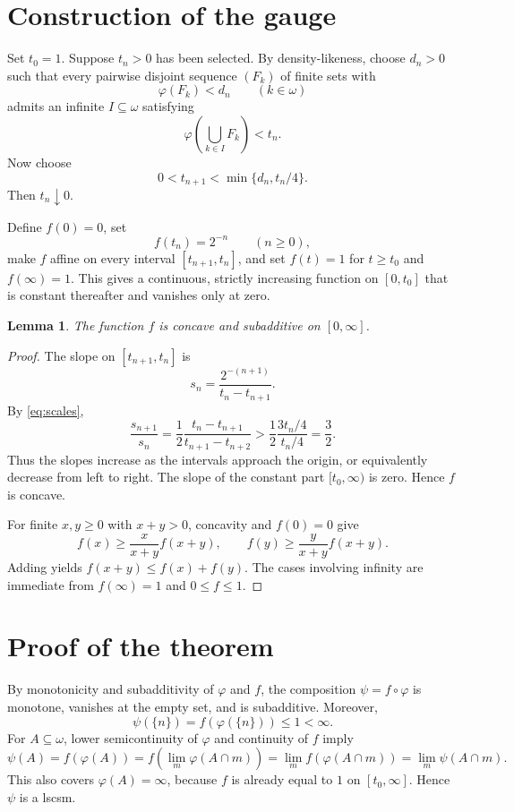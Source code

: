 \documentclass[11pt]{article}
\newtheorem{lemma}[theorem]{Lemma}
\begin{document}
\section{Construction of the gauge}

Set $t_0=1$. Suppose $t_n>0$ has been selected. By density-likeness, choose $d_n>0$ such that every pairwise disjoint sequence $(F_k)$ of finite sets with
\[
 \varphi(F_k)<d_n\qquad(k\in\omega)
\]
admits an infinite $I\subseteq\omega$ satisfying
\[
 \varphi\left(\bigcup_{k\in I}F_k\right)<t_n.
\]
Now choose
\begin{equation}\label{eq:scales}
 0<t_{n+1}<\min\{d_n,t_n/4\}.
\end{equation}
Then $t_n\downarrow0$.

Define $f(0)=0$, set
\[
 f(t_n)=2^{-n}\qquad(n\ge0),
\]
make $f$ affine on every interval $[t_{n+1},t_n]$, and set $f(t)=1$ for $t\ge t_0$ and $f(\infty)=1$. This gives a continuous, strictly increasing function on $[0,t_0]$ that is constant thereafter and vanishes only at zero.

\begin{lemma}\label{lem:concave}
The function $f$ is concave and subadditive on $[0,\infty]$.
\end{lemma}

\begin{proof}
The slope on $[t_{n+1},t_n]$ is
\[
 s_n=\frac{2^{-(n+1)}}{t_n-t_{n+1}}.
\]
By \eqref{eq:scales},
\[
 \frac{s_{n+1}}{s_n}
 =\frac12\frac{t_n-t_{n+1}}{t_{n+1}-t_{n+2}}
 >\frac12\frac{3t_n/4}{t_n/4}
 =\frac32.
\]
Thus the slopes increase as the intervals approach the origin, or equivalently decrease from left to right. The slope of the constant part $[t_0,\infty)$ is zero. Hence $f$ is concave.

For finite $x,y\ge0$ with $x+y>0$, concavity and $f(0)=0$ give
\[
 f(x)\ge\frac{x}{x+y}f(x+y),
 \qquad
 f(y)\ge\frac{y}{x+y}f(x+y).
\]
Adding yields $f(x+y)\le f(x)+f(y)$. The cases involving infinity are immediate from $f(\infty)=1$ and $0\le f\le1$.
\end{proof}

\section{Proof of the theorem}

By monotonicity and subadditivity of $\varphi$ and $f$, the composition $\psi=f\circ\varphi$ is monotone, vanishes at the empty set, and is subadditive. Moreover,
\[
 \psi(\{n\})=f(\varphi(\{n\}))\le1<\infty.
\]
For $A\subseteq\omega$, lower semicontinuity of $\varphi$ and continuity of $f$ imply
\[
 \psi(A)=f(\varphi(A))
 =f\left(\lim_m\varphi(A\cap m)\right)
 =\lim_m f(\varphi(A\cap m))
 =\lim_m\psi(A\cap m).
\]
This also covers $\varphi(A)=\infty$, because $f$ is already equal to $1$ on $[t_0,\infty]$. Hence $\psi$ is a lscsm.
\end{document}
